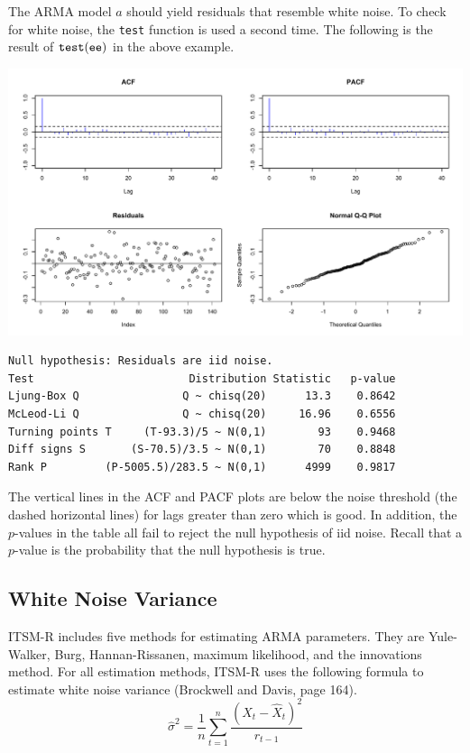 \documentclass[12pt]{article}
\begin{document}
The ARMA model $a$ should yield residuals that resemble white noise.
To check for white noise, the {\tt test} function is used a second time.
The following is the result of $\tt test(ee)$ in the above example.

\begin{center}
\includegraphics[scale=0.3]{Rplot-6.pdf}
\end{center}

\begin{verbatim}
Null hypothesis: Residuals are iid noise.
Test                        Distribution Statistic   p-value
Ljung-Box Q                Q ~ chisq(20)      13.3    0.8642
McLeod-Li Q                Q ~ chisq(20)     16.96    0.6556
Turning points T     (T-93.3)/5 ~ N(0,1)        93    0.9468
Diff signs S       (S-70.5)/3.5 ~ N(0,1)        70    0.8848
Rank P         (P-5005.5)/283.5 ~ N(0,1)      4999    0.9817
\end{verbatim}

The vertical lines in the ACF and PACF plots are below the noise threshold
(the dashed horizontal lines)
for lags greater than zero which is good.
In addition, the $p$-values in the table all fail to reject the null hypothesis
of iid noise.
Recall that a $p$-value is the probability that the null hypothesis is true.

\subsection{White Noise Variance}

ITSM-R includes five methods for estimating ARMA parameters.
They are Yule-Walker, Burg, Hannan-Rissanen, maximum likelihood,
and the innovations method.
For all estimation methods, ITSM-R uses
the following formula to estimate white noise variance
(Brockwell and Davis, page 164).
\[
\hat\sigma^2=\frac{1}{n}\sum_{t=1}^n\frac{(X_t-\hat X_t)^2}{r_{t-1}}
\]
\end{document}
